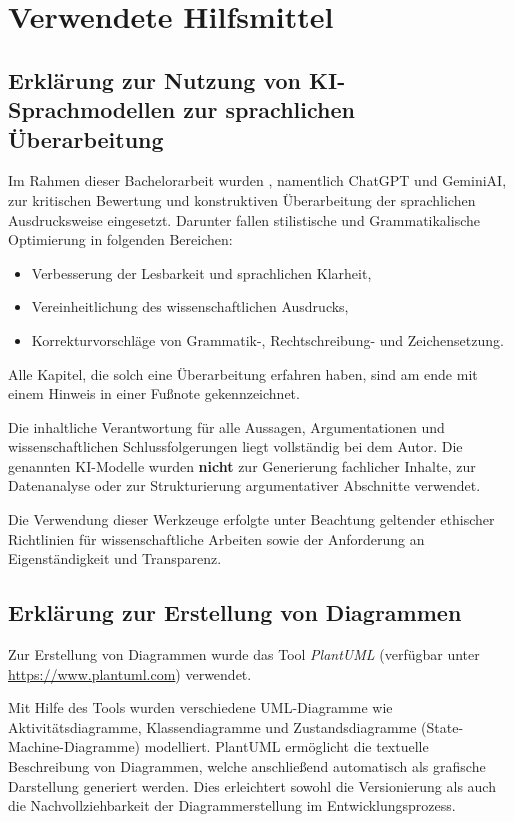 
\section{Verwendete Hilfsmittel}

\subsection{Erkl\"arung zur Nutzung von KI-Sprachmodellen zur sprachlichen \"Uberarbeitung}
Im Rahmen dieser Bachelorarbeit wurden , namentlich ChatGPT und GeminiAI, zur kritischen Bewertung und konstruktiven \"Uberarbeitung der sprachlichen Ausdrucksweise eingesetzt. Darunter fallen stilistische und Grammatikalische Optimierung in folgenden Bereichen:

\begin{itemize}
	\item Verbesserung der Lesbarkeit und sprachlichen Klarheit,
	\item Vereinheitlichung des wissenschaftlichen Ausdrucks,
	\item Korrekturvorschl\"age von Grammatik-, Rechtschreibung- und Zeichensetzung.
\end{itemize}

Alle Kapitel, die solch eine \"Uberarbeitung erfahren haben, sind am ende mit einem Hinweis in einer Fu{\ss}note gekennzeichnet.

Die inhaltliche Verantwortung f\"ur alle Aussagen, Argumentationen und wissenschaftlichen Schlussfolgerungen liegt vollst\"andig bei dem Autor. Die genannten KI-Modelle wurden \textbf{nicht} zur Generierung fachlicher Inhalte, zur Datenanalyse oder zur Strukturierung argumentativer Abschnitte verwendet.

Die Verwendung dieser Werkzeuge erfolgte unter Beachtung geltender ethischer Richtlinien f\"ur wissenschaftliche Arbeiten sowie der Anforderung an Eigenst\"andigkeit und Transparenz.

\subsection{Erkl\"arung zur Erstellung von Diagrammen}

Zur Erstellung von Diagrammen wurde das Tool \textit{PlantUML} (verf\"ugbar unter \url{https://www.plantuml.com}) verwendet. 

Mit Hilfe des Tools wurden verschiedene UML-Diagramme wie Aktivit\"atsdiagramme, Klassendiagramme und Zustandsdiagramme (State-Machine-Diagramme) modelliert. PlantUML erm\"oglicht die textuelle Beschreibung von Diagrammen, welche anschlie{\ss}end automatisch als grafische Darstellung generiert werden. Dies erleichtert sowohl die Versionierung als auch die Nachvollziehbarkeit der Diagrammerstellung im Entwicklungsprozess.